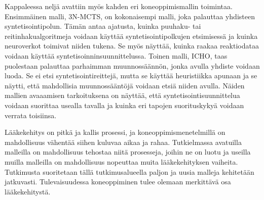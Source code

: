 \documentclass[finnish,twoside,censored,tkt,sw-line]{HYthesisML}
\begin{document}
Kappaleessa neljä avattiin myös kahden eri koneoppimismallin toimintaa.
Ensimmäinen malli, 3N-MCTS, on kokonaisempi malli, joka palauttaa yhdisteen syntetisointipolun.
Tämän antaa ajatusta, kuinka puuhaku- tai reitinhakualgoritmeja voidaan käyttää syntetisointipolkujen etsimisessä ja kuinka neuroverkot toimivat niiden tukena.
Se myös näyttää, kuinka raakaa reaktiodataa voidaan käyttää syntetisoinninsuunnittelussa.
Toinen malli, ICHO, taas puolestaan palauttaa parhaimman muunnossäännön, jonka avulla yhdiste voidaan luoda.
Se ei etsi syntetisointireittejä, mutta se käyttää heuristiikka apunaan ja se näytti, että mahdollisia muunnossääntöjä voidaan etsiä niiden avulla.
Näiden mallien avaaamisen tarkoituksena on näyttää, että syntetisointisuunnittelua voidaan suorittaa usealla tavalla ja kuinka eri tapojen suorituskykyä voidaan verrata toisiinsa.

Lääkekehitys on pitkä ja kallis prosessi, ja koneoppimismenetelmillä on mahdollisuus vähentää siihen kuluvaa aikaa ja rahaa.
Tutkielmassa avatuilla malleilla on mahdollisuus tehostaa niitä prosesseja, joihin ne on luotu ja useilla muilla malleilla on mahdollisuus nopeuttaa muita lääkekehityksen vaiheita.
Tutkimusta suoritetaan tällä tutkimusalueella paljon ja uusia malleja kehitetään jatkuvasti.
Tulevaisuudessa koneoppiminen tulee olemaan merkittävä osa lääkekehitystä.


\cleardoublepage{}                          %
\printbibliography{}

\backmatter{}



\end{document}
